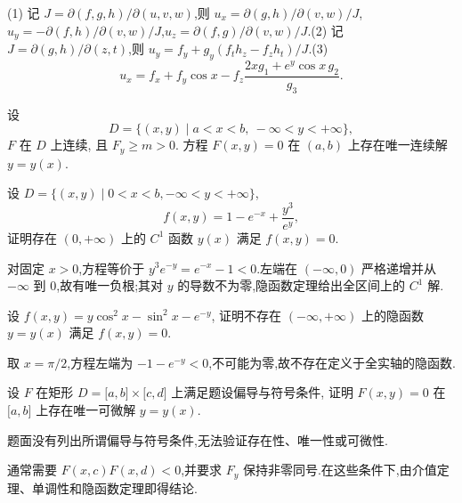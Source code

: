 \begin{solution}
    (1) 记 $J=\partial(f,g,h)/\partial(u,v,w)$,则
    $u_x=\partial(g,h)/\partial(v,w)/J$,$u_y=-\partial(f,h)/\partial(v,w)/J$,$u_z=\partial(f,g)/\partial(v,w)/J$.(2) 记 $J=\partial(g,h)/\partial(z,t)$,则
    $u_y=f_y+g_y(f_th_z-f_zh_t)/J$.(3)
    \[
        u_x=f_x+f_y\cos x-f_z\dfrac{2xg_1+e^y\cos x\,g_2}{g_3}.
    \]
\end{solution}




\begin{proposition}
    设
    \[
        D=\{(x,y)\mid a<x<b,\ -\infty<y<+\infty\},
    \]
    $F$ 在 $D$ 上连续, 且 $F_y\geq m>0$. 方程 $F(x,y)=0$ 在 $(a,b)$ 上存在唯一连续解 $y=y(x)$.
\end{proposition}

\begin{example}
    设 $D=\{(x,y)\mid0<x<b,-\infty<y<+\infty\}$,
    \[
        f(x,y)=1-e^{-x}+\dfrac{y^3}{e^y},
    \]
    证明存在 $(0,+\infty)$ 上的 $C^1$ 函数 $y(x)$ 满足 $f(x,y)=0$.
\end{example}
\exampleblank

\begin{solution}
    对固定 $x>0$,方程等价于 $y^3e^{-y}=e^{-x}-1<0$.左端在 $(-\infty,0)$ 严格递增并从 $-\infty$ 到 $0$,故有唯一负根;其对 $y$ 的导数不为零,隐函数定理给出全区间上的 $C^1$ 解.
\end{solution}

\begin{example}
    设 $f(x,y)=y\cos^2x-\sin^2x-e^{-y}$, 证明不存在 $(-\infty,+\infty)$ 上的隐函数 $y=y(x)$ 满足 $f(x,y)=0$.
\end{example}
\exampleblank

\begin{solution}
    取 $x=\pi/2$,方程左端为 $-1-e^{-y}<0$,不可能为零,故不存在定义于全实轴的隐函数.
\end{solution}

\begin{example}
    设 $F$ 在矩形 $D=\lbrack a,b\rbrack\times\lbrack c,d\rbrack$ 上满足题设偏导与符号条件, 证明 $F(x,y)=0$ 在 $\lbrack a,b\rbrack$ 上存在唯一可微解 $y=y(x)$.
\end{example}
\exampleblank

\begin{solution}
    题面没有列出所谓偏导与符号条件,无法验证存在性、唯一性或可微性.

    通常需要 $F(x,c)F(x,d)<0$,并要求 $F_y$ 保持非零同号.在这些条件下,由介值定理、单调性和隐函数定理即得结论.
\end{solution}

